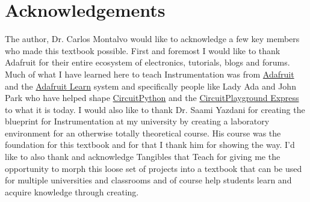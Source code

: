 \section{Acknowledgements}

The author, Dr. Carlos Montalvo would like to acknowledge a few key
members who made this textbook possible. First and foremost I would
like to thank Adafruit for their entire ecosystem of electronics,
tutorials, blogs and forums. Much of what I have learned here to teach
Instrumentation was from \href{https://www.adafruit.com/}{Adafruit}
and the \href{https://learn.adafruit.com/}{Adafruit Learn} system and 
specifically people like Lady Ada and John Park who have helped shape
\href{https://circuitpython.org/}{CircuitPython} and the
\href{https://www.adafruit.com/product/3333}{CircuitPlayground
  Express} to what it is today. I 
would also like to thank Dr. Saami Yazdani for creating the blueprint
for Instrumentation at my university by creating a laboratory
environment for an otherwise totally theoretical course. His course
was the foundation for this textbook and for that I thank him for
showing the way. I’d like to also thank and acknowledge Tangibles that
Teach for giving me the opportunity to morph this loose set of
projects into a textbook that can be used for multiple universities
and classrooms and of course help students learn and acquire knowledge
through creating.
